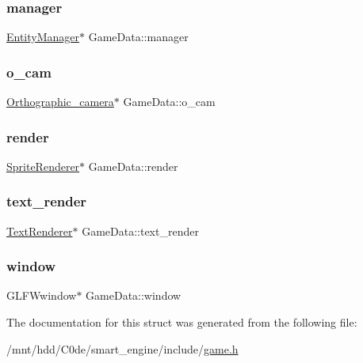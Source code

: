 \mbox{\label{structGameData_afe20255f5a9a5a93b581cd333ac75853}} 
\subsubsection{\texorpdfstring{manager}{manager}}
{\footnotesize\ttfamily \hyperlink{classEntityManager}{Entity\+Manager}$\ast$ Game\+Data\+::manager}

\mbox{\label{structGameData_a9e133f6b5e0d19889e94505db479ca69}} 
\subsubsection{\texorpdfstring{o\+\_\+cam}{o\_cam}}
{\footnotesize\ttfamily \hyperlink{classOrthographic__camera}{Orthographic\+\_\+camera}$\ast$ Game\+Data\+::o\+\_\+cam}

\mbox{\label{structGameData_a85da8dd3e426c436097a9f62b34a59f1}} 
\subsubsection{\texorpdfstring{render}{render}}
{\footnotesize\ttfamily \hyperlink{classSpriteRenderer}{Sprite\+Renderer}$\ast$ Game\+Data\+::render}

\mbox{\label{structGameData_a64a9de895cbaf5200a75085c894217f0}} 
\subsubsection{\texorpdfstring{text\+\_\+render}{text\_render}}
{\footnotesize\ttfamily \hyperlink{classTextRenderer}{Text\+Renderer}$\ast$ Game\+Data\+::text\+\_\+render}

\mbox{\label{structGameData_af9735787501e4c8c1d26787c322cd6dd}} 
\subsubsection{\texorpdfstring{window}{window}}
{\footnotesize\ttfamily G\+L\+F\+Wwindow$\ast$ Game\+Data\+::window}



The documentation for this struct was generated from the following file\+:\begin{DoxyCompactItemize}
\item 
/mnt/hdd/\+C0de/smart\+\_\+engine/include/\hyperlink{game_8h}{game.\+h}\end{DoxyCompactItemize}
